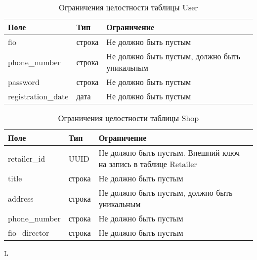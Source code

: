 \begin{table}[ht]
	\begin{center}
		\begin{threeparttable}
			\caption{Ограничения целостности таблицы User}
			\label{tbl:entity_user}
			\begin{tabular}{|p{4.5cm}|p{2.5cm}|p{8.5cm}|}
				\hline 
				\textbf{Поле} & \textbf{Тип} & \textbf{Ограничение}  \\
				\hline
				fio & строка & Не должно быть пустым  \\
				\hline
				phone\_number & строка & Не должно быть пустым, должно быть уникальным  \\
				\hline
				password & строка & Не должно быть пустым  \\
				\hline
				registration\_date & дата & Не должно быть пустым  \\
				\hline
			\end{tabular}
		\end{threeparttable}			
	\end{center}
\end{table}

\begin{table}[ht]
	\begin{center}
		\begin{threeparttable}
			\caption{Ограничения целостности таблицы Shop}
			\label{tbl:entity_shop}
			\begin{tabular}{|p{4.5cm}|p{2.5cm}|p{8.5cm}|}
				\hline 
				\textbf{Поле} & \textbf{Тип} & \textbf{Ограничение}  \\
				\hline
				retailer\_id & UUID & Не должно быть пустым. Внешний ключ на запись в таблице Retailer   \\
				\hline
				title & строка & Не должно быть пустым \\
				\hline
				address & строка & Не должно быть пустым, должно быть уникальным  \\
				\hline
				phone\_number & строка & Не должно быть пустым  \\
				\hline
				fio\_director & строка & Не должно быть пустым  \\
				\hline
			\end{tabular}
		\end{threeparttable}			
	\end{center}
\end{table}
L

